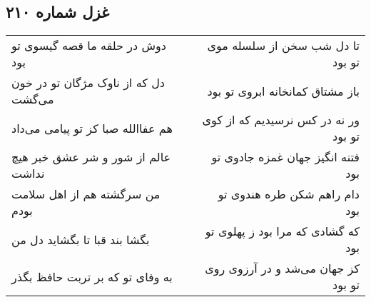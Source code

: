 \begin{center}
\section*{غزل شماره ۲۱۰}
\label{sec:sh210}
\begin{longtable}{l p{0.5cm} r}
دوش در حلقه ما قصه گیسوی تو بود
&&
تا دل شب سخن از سلسله موی تو بود
\\
دل که از ناوک مژگان تو در خون می‌گشت
&&
باز مشتاق کمانخانه ابروی تو بود
\\
هم عفاالله صبا کز تو پیامی می‌داد
&&
ور نه در کس نرسیدیم که از کوی تو بود
\\
عالم از شور و شر عشق خبر هیچ نداشت
&&
فتنه انگیز جهان غمزه جادوی تو بود
\\
من سرگشته هم از اهل سلامت بودم
&&
دام راهم شکن طره هندوی تو بود
\\
بگشا بند قبا تا بگشاید دل من
&&
که گشادی که مرا بود ز پهلوی تو بود
\\
به وفای تو که بر تربت حافظ بگذر
&&
کز جهان می‌شد و در آرزوی روی تو بود
\\
\end{longtable}
\end{center}
